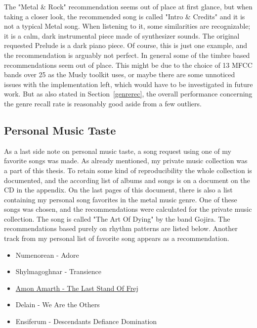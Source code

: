 \noindent The "Metal \& Rock" recommendation seems out of place at first glance, but when taking a closer look, the recommended song is called "Intro \& Credits" and it is not a typical Metal song. When listening to it, some similarities are recognizable; it is a calm, dark instrumental piece made of synthesizer sounds. The original requested Prelude is a dark piano piece. Of course, this is just one example, and the recommendation is arguably not perfect. In general some of the timbre based recommendations seem out of place. This might be due to the choice of 13 MFCC bands over 25 as the Musly toolkit uses, or maybe there are some unnoticed issues with the implementation left, which would have to be investigated in future work. But as also stated in Section~\ref{genrerec}, the overall performance concerning the genre recall rate is reasonably good aside from a few outliers.

\subsection{Personal Music Taste}\label{personal}

As a last side note on personal music taste, a song request using one of my favorite songs was made. As already mentioned, my private music collection was a part of this thesis. To retain some kind of reproducibility the whole collection is documented, and the according list of albums and songs is on a document on the CD in the appendix. On the last pages of this document, there is also a list containing my personal song favorites in the metal music genre. One of these songs was chosen, and the recommendations were calculated for the private music collection. The song is called "The Art Of Dying" by the band Gojira. The recommendations based purely on rhythm patterns are listed below. Another track from my personal list of favorite song appears as a recommendation. 

\begin{itemize}
	\setlength\itemsep{-0.5em}
	\item Numenorean - Adore
	\item Shylmagoghnar - Transience
	\item \underline{Amon Amarth - The Last Stand Of Frej}
	\item Delain - We Are the Others
	\item Ensiferum - Descendants Defiance Domination
\end{itemize}

